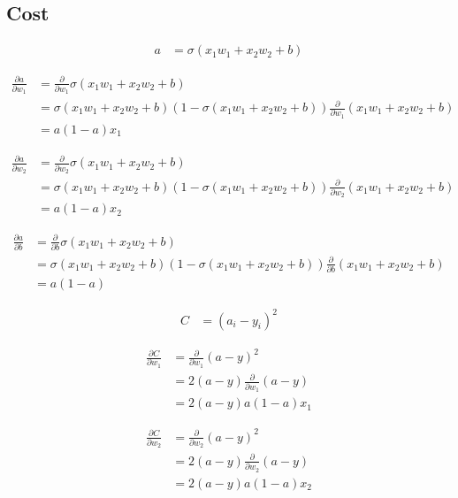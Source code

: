 \documentclass{article}
\begin{document}
\subsection{Cost}

\begin{align*}
a &= \sigma(x_1 w_1 + x_2 w_2 + b)
\end{align*}

\begin{align*}
\frac{\partial a}{\partial w_1} &= \frac{\partial}{\partial w_1} \sigma(x_1 w_1 + x_2 w_2 + b)\\
&= \sigma(x_1 w_1 + x_2 w_2 + b)(1 - \sigma(x_1 w_1 + x_2 w_2 + b)) \frac{\partial}{\partial w_1}(x_1 w_1 + x_2 w_2 + b)\\
&= a(1 - a)x_1
\end{align*}

\begin{align*}
\frac{\partial a}{\partial w_2} &= \frac{\partial}{\partial w_2} \sigma(x_1 w_1 + x_2 w_2 + b)\\
&= \sigma(x_1 w_1 + x_2 w_2 + b)(1 - \sigma(x_1 w_1 + x_2 w_2 + b)) \frac{\partial}{\partial w_2}(x_1 w_1 + x_2 w_2 + b)\\
&= a(1 - a)x_2
\end{align*}

\begin{align*}
\frac{\partial a}{\partial b} &= \frac{\partial}{\partial b} \sigma(x_1 w_1 + x_2 w_2 + b)\\
&= \sigma(x_1 w_1 + x_2 w_2 + b)(1 - \sigma(x_1 w_1 + x_2 w_2 + b)) \frac{\partial}{\partial b}(x_1 w_1 + x_2 w_2 + b)\\
&= a(1 - a)
\end{align*}

\begin{align*}
C &= (a_i - y_i)^2
\end{align*}

\begin{align*}
\frac{\partial C}{\partial w_1} &= \frac{\partial}{\partial w_1} (a - y)^2\\
&= 2(a - y) \frac{\partial}{\partial w_1} (a - y)\\
&= 2(a - y)a(1 - a)x_1
\end{align*}

\begin{align*}
\frac{\partial C}{\partial w_2} &= \frac{\partial}{\partial w_2} (a - y)^2\\
&= 2(a - y) \frac{\partial}{\partial w_2} (a - y)\\
&= 2(a - y)a(1 - a)x_2
\end{align*}
\end{document}
